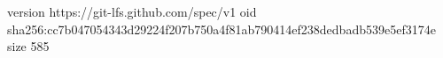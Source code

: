 version https://git-lfs.github.com/spec/v1
oid sha256:cc7b047054343d29224f207b750a4f81ab790414ef238dedbadb539e5ef3174e
size 585
